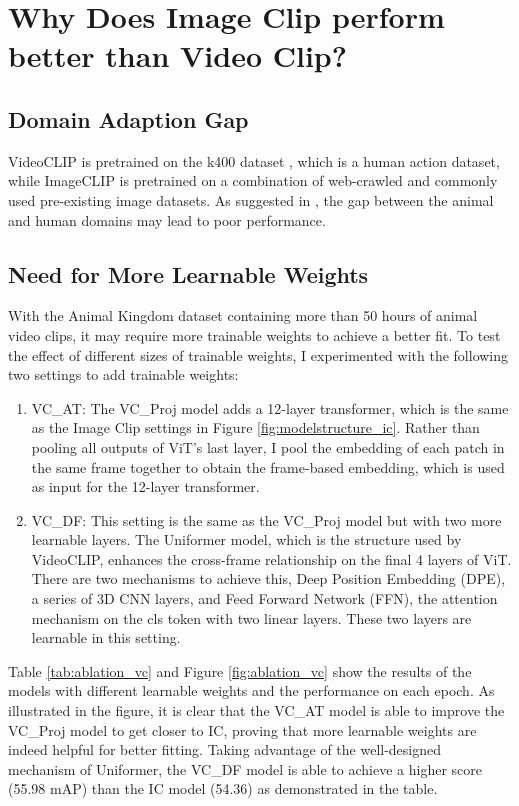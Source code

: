 \section{Why Does Image Clip perform better than Video Clip?}
\label{sec:ablation_vc}
\subsection{Domain Adaption Gap}
VideoCLIP is pretrained on the k400 dataset \parencite{kay2017kinetics}, which is a human action dataset, while ImageCLIP is pretrained on a combination of web-crawled and commonly used pre-existing image datasets. As suggested in \parencite{farahani2021brief}, the gap between the animal and human domains may lead to poor performance.

\subsection{Need for More Learnable Weights}
With the Animal Kingdom dataset containing more than 50 hours of animal video clips, it may require more trainable weights to achieve a better fit. To test the effect of different sizes of trainable weights, I experimented with the following two settings to add trainable weights:

\begin{enumerate}
    \item VC\_AT: The VC\_Proj model adds a 12-layer transformer, which is the same as the Image Clip settings in Figure \ref{fig:modelstructure_ic}. Rather than pooling all outputs of ViT's last layer, I pool the embedding of each patch in the same frame together to obtain the frame-based embedding, which is used as input for the 12-layer transformer.
    \item VC\_DF: This setting is the same as the VC\_Proj model but with two more learnable layers. The Uniformer model, which is the structure used by VideoCLIP, enhances the cross-frame relationship on the final 4 layers of ViT. There are two mechanisms to achieve this, Deep Position Embedding (DPE), a series of 3D CNN layers, and Feed Forward Network (FFN), the attention mechanism on the cls token with two linear layers. These two layers are learnable in this setting.
\end{enumerate}

Table \ref{tab:ablation_vc} and Figure \ref{fig:ablation_vc} show the results of the models with different learnable weights and the performance on each epoch. As illustrated in the figure, it is clear that the VC\_AT model is able to improve the VC\_Proj model to get closer to IC, proving that more learnable weights are indeed helpful for better fitting. Taking advantage of the well-designed mechanism of Uniformer, the VC\_DF model is able to achieve a higher score (55.98 mAP) than the IC model (54.36) as demonstrated in the table. 

